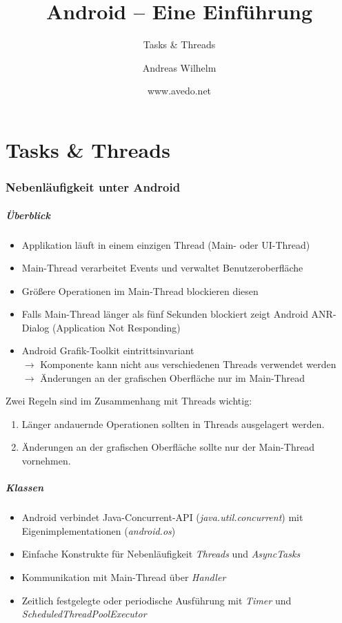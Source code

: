 \title{Android -- Eine Einführung}
\subtitle{Tasks \& Threads}
\author[A. Wilhelm]{Andreas Wilhelm}
\titlegraphic{}
\date{www.avedo.net}

\begin{frame}[plain]
  \titlepage
\end{frame}

\part{Tasks \& Threads}

\section{Nebenläufigkeit unter Android}
\begin{frame}
   \frametitle{Überblick}
   \begin{itemize}
      \item Applikation läuft in einem einzigen Thread (Main- oder UI-Thread)
      \item Main-Thread verarbeitet Events und verwaltet Benutzeroberfläche
      \item Größere Operationen im Main-Thread blockieren diesen
      \item Falls Main-Thread länger als fünf Sekunden blockiert zeigt Android 
      	ANR-Dialog (Application Not Responding)
      \item Android Grafik-Toolkit eintrittsinvariant\\
      	$\rightarrow$ Komponente kann nicht aus verschiedenen Threads verwendet werden\\
      	$\rightarrow$ Änderungen an der grafischen Oberfläche nur im Main-Thread
   \end{itemize}
   
   Zwei Regeln sind im Zusammenhang mit Threads wichtig:
   \begin{enumerate}
		\item Länger andauernde Operationen sollten in Threads ausgelagert werden.
		\item Änderungen an der grafischen Oberfläche sollte nur der Main-Thread vornehmen.
	\end{enumerate}
\end{frame}

\begin{frame}
   \frametitle{Klassen}
   \begin{itemize}
      \item Android verbindet Java-Concurrent-API (\emph{java.util.concurrent}) 
      	mit Eigenimplementationen (\emph{android.os}) 
		\item Einfache Konstrukte für Nebenläufigkeit \emph{Threads} und \emph{AsyncTasks}
		\item Kommunikation mit Main-Thread über \emph{Handler}
		\item Zeitlich festgelegte oder periodische Ausführung mit 
			\emph{Timer} und \emph{ScheduledThreadPoolExecutor}
   \end{itemize}
\end{frame}

